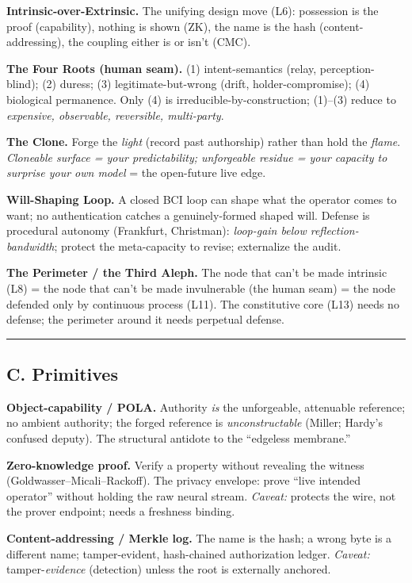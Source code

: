 \documentclass[11pt]{article}
\begin{document}
\textbf{Intrinsic-over-Extrinsic.} The unifying design move (L6): possession is the proof (capability), nothing is shown (ZK), the name is the hash (content-addressing), the coupling either is or isn't (CMC).

\textbf{The Four Roots (human seam).} (1) intent-semantics (relay, perception-blind); (2) duress; (3) legitimate-but-wrong (drift, holder-compromise); (4) biological permanence. Only (4) is irreducible-by-construction; (1)–(3) reduce to \emph{expensive, observable, reversible, multi-party}.

\textbf{The Clone.} Forge the \emph{light} (record past authorship) rather than hold the \emph{flame}. \emph{Cloneable surface = your predictability; unforgeable residue = your capacity to surprise your own model} = the open-future live edge.

\textbf{Will-Shaping Loop.} A closed BCI loop can shape what the operator comes to want; no authentication catches a genuinely-formed shaped will. Defense is procedural autonomy (Frankfurt, Christman): \emph{loop-gain below reflection- bandwidth}; protect the meta-capacity to revise; externalize the audit.

\textbf{The Perimeter /\allowbreak{} the Third Aleph.} The node that can't be made intrinsic (L8) = the node that can't be made invulnerable (the human seam) = the node defended only by continuous process (L11). The constitutive core (L13) needs no defense; the perimeter around it needs perpetual defense.

\medskip\noindent\rule{\linewidth}{0.3pt}\medskip

\subsection*{C. Primitives}

\textbf{Object-capability /\allowbreak{} POLA.} Authority \emph{is} the unforgeable, attenuable reference; no ambient authority; the forged reference is \emph{unconstructable} (Miller; Hardy's confused deputy). The structural antidote to the ``edgeless membrane.''

\textbf{Zero-knowledge proof.} Verify a property without revealing the witness (Goldwasser–Micali–Rackoff). The privacy envelope: prove ``live intended operator'' without holding the raw neural stream. \emph{Caveat:} protects the wire, not the prover endpoint; needs a freshness binding.

\textbf{Content-addressing /\allowbreak{} Merkle log.} The name is the hash; a wrong byte is a different name; tamper-evident, hash-chained authorization ledger. \emph{Caveat:} tamper-\emph{evidence} (detection) unless the root is externally anchored.
\end{document}
